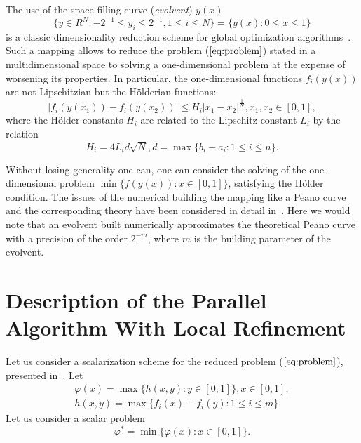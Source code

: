 \documentclass{llncs}
\begin{document}
The use of the space-filling curve (\textit{evolvent}) \(y(x)\)
\begin{displaymath}
\label{cube}
\lbrace y\in R^N:-2^{-1}\leqslant y_i\leqslant 2^{-1},1\leqslant i\leqslant
N\rbrace=\{y(x):0\leqslant x\leqslant 1\}
\end{displaymath}
is a classic dimensionality reduction scheme for global optimization algorithms~\cite{evolvents2013}.
Such a mapping allows to reduce the problem (\(\ref{eq:problem}\)) stated in a
multidimensional space to solving a one-dimensional problem at the expense of worsening its
properties.
In particular, the one-dimensional functions \(f_i(y(x))\) are not Lipschitzian but the
H\"olderian functions:
\begin{equation}
\label{eq:holder}
|f_i(y(x_1))-f_i(y(x_2))|\leqslant H_i{|x_1-x_2|}^{\frac{1}{N}},x_1,x_2\in[0,1],
\end{equation}
where the H\"older constants \(H_i\) are related to the Lipschitz constant \(L_i\) by the relation
\begin{displaymath}
H_i=4L_id\sqrt{N},d=\max\{b_i-a_i:1\leqslant i\leqslant n\}.
\end{displaymath}
\par
Without losing generality one can, one can consider the solving of the
one-dimensional problem \(\min\{f(y(x)): x\in [0,1]\}\), satisfying the H\"older condition. The
issues of the numerical building the mapping like a Peano curve and the corresponding theory
have been considered in detail in~\cite{evolvents2013}. Here we would note that an evolvent
built numerically approximates the theoretical Peano curve with a precision of the
order \(2^{-m}\), where \(m\) is the building parameter of the evolvent.

\section{Description of the Parallel Algorithm With Local Refinement}
\label{sec:algorithm}
Let us consider a scalarization scheme for the reduced problem (\(\ref{eq:problem}\)),
presented in~\cite{markinStrongin1993}. Let
\begin{eqnarray*}
  \varphi(x)=\max\{h(x,y):y\in [0,1]\},x\in [0,1],\\
  h(x,y)=\max\{f_i(x)-f_i(y):1\leqslant i\leqslant m\}.
\end{eqnarray*}
Let us consider a scalar problem
\begin{equation}
  \label{eq:aux_problem}
  \varphi^*=\min\{\varphi(x):x\in [0,1]\}.
\end{equation}
\end{document}
